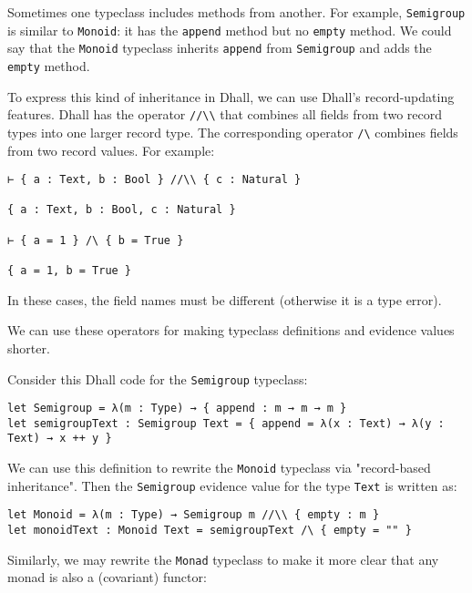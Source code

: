 Sometimes one typeclass includes methods from another.
For example, \lstinline!Semigroup! is similar to \lstinline!Monoid!: it has the \lstinline!append! method but no \lstinline!empty! method.
We could say that the \lstinline!Monoid! typeclass inherits \lstinline!append! from \lstinline!Semigroup! and adds the \lstinline!empty! method.


To express this kind of inheritance in Dhall, we can use Dhall's record-updating features.
Dhall has the operator \lstinline!//\\! that combines all fields from two record types into one larger record type.
The corresponding operator \lstinline!/\! combines fields from two record values.
For example:


\begin{lstlisting}[language=Dhall]
⊢ { a : Text, b : Bool } //\\ { c : Natural }

{ a : Text, b : Bool, c : Natural }

⊢ { a = 1 } /\ { b = True }

{ a = 1, b = True }
\end{lstlisting}


In these cases, the field names must be different (otherwise it is a type error).


We can use these operators for making typeclass definitions and evidence values shorter.


Consider this Dhall code for the \lstinline!Semigroup! typeclass:


\begin{lstlisting}[language=Dhall]
let Semigroup = λ(m : Type) → { append : m → m → m }
let semigroupText : Semigroup Text = { append = λ(x : Text) → λ(y : Text) → x ++ y }
\end{lstlisting}


We can use this definition to rewrite the \lstinline!Monoid! typeclass via "record-based inheritance".
Then the \lstinline!Semigroup! evidence value for the type \lstinline!Text! is written as:


\begin{lstlisting}[language=Dhall]
let Monoid = λ(m : Type) → Semigroup m //\\ { empty : m }
let monoidText : Monoid Text = semigroupText /\ { empty = "" } 
\end{lstlisting}


Similarly, we may rewrite the \lstinline!Monad! typeclass to make it more clear that any monad is also a (covariant) functor:


